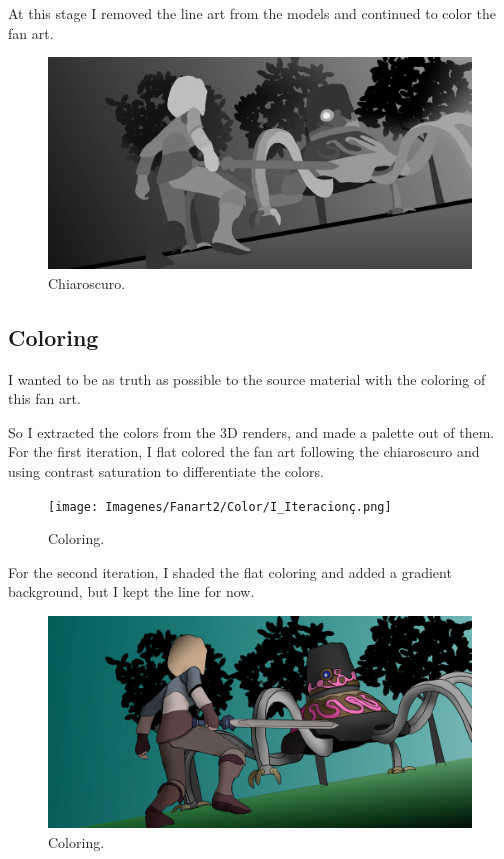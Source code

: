 \documentclass{cup-pan}
\begin{document}
        At this stage I removed the line art from the models and continued to color the fan art. 
        \begin{figure}[H]
            \includegraphics[width=\textwidth]{Imagenes/Fanart2/Claroscuro/IIII_Iteracion.png}
            \caption{Chiaroscuro.}
        \end{figure}

\newpage
    \subsection{Coloring}
        I wanted to be as truth as possible to the source material with the coloring of this fan art. 
        
        So I extracted the colors from the 3D renders, and made a palette out of them.\\

        For the first iteration, I flat colored the fan art following the chiaroscuro and using contrast saturation to differentiate the colors.\\
        \begin{figure}[H]
            \texttt{[image: Imagenes/Fanart2/Color/I\_Iteracionç.png]}
            \caption{Coloring.}
        \end{figure}

        For the second iteration, I shaded the flat coloring and added a gradient background, but I kept the line for now.\\
        \begin{figure}[H]
            \includegraphics[width=\textwidth]{Imagenes/Fanart2/Color/II_Iteracion.png}
            \caption{Coloring.}
        \end{figure}
\end{document}
